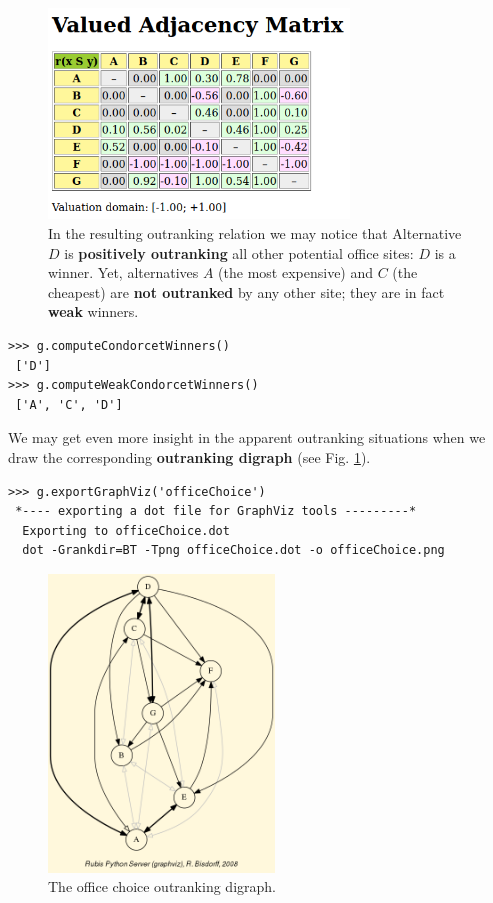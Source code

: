 \begin{figure}[h]
\sidecaption
\includegraphics[width=8cm]{Figures/officeChoiceOutranking.png}
\caption{In the resulting outranking relation we may notice that Alternative $D$ is \textbf{positively outranking} all other potential office sites: $D$ is a \Condorcet winner. Yet, alternatives $A$ (the most expensive) and $C$ (the cheapest) are \textbf{not outranked} by any other site; they are in fact \textbf{weak} \Condorcet winners.
}
\label{fig:6.2}       %
\end{figure}

\begin{lstlisting}
>>> g.computeCondorcetWinners()
 ['D']
>>> g.computeWeakCondorcetWinners()
 ['A', 'C', 'D']
\end{lstlisting}

We may get even more insight in the apparent outranking situations when we draw the corresponding \textbf{outranking digraph} (see Fig. \ref{fig:6.2}).

\begin{lstlisting}
>>> g.exportGraphViz('officeChoice')
 *---- exporting a dot file for GraphViz tools ---------*
  Exporting to officeChoice.dot
  dot -Grankdir=BT -Tpng officeChoice.dot -o officeChoice.png
\end{lstlisting}

\begin{figure}[h]
\sidecaption
\includegraphics[width=6cm]{Figures/officeChoice.png}
\caption{The office choice outranking digraph.}
\label{fig:6.3}       %
\end{figure}

